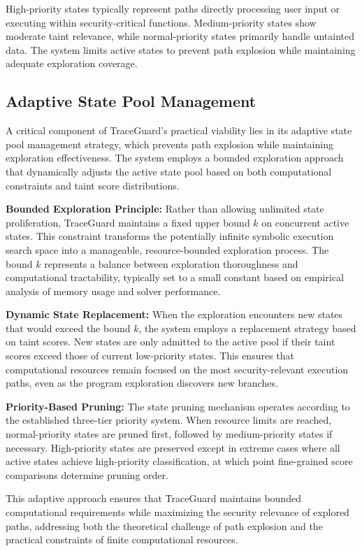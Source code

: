 High-priority states typically represent paths directly processing user input or executing within security-critical functions. Medium-priority states show moderate taint relevance, while normal-priority states primarily handle untainted data. The system limits active states to prevent path explosion while maintaining adequate exploration coverage.

\subsection{Adaptive State Pool Management}

A critical component of TraceGuard's practical viability lies in its adaptive state pool management strategy, which prevents path explosion while maintaining exploration effectiveness. The system employs a bounded exploration approach that dynamically adjusts the active state pool based on both computational constraints and taint score distributions.

\textbf{Bounded Exploration Principle:} Rather than allowing unlimited state proliferation, TraceGuard maintains a fixed upper bound $k$ on concurrent active states. This constraint transforms the potentially infinite symbolic execution search space into a manageable, resource-bounded exploration process. The bound $k$ represents a balance between exploration thoroughness and computational tractability, typically set to a small constant based on empirical analysis of memory usage and solver performance.

\textbf{Dynamic State Replacement:} When the exploration encounters new states that would exceed the bound $k$, the system employs a replacement strategy based on taint scores. New states are only admitted to the active pool if their taint scores exceed those of current low-priority states. This ensures that computational resources remain focused on the most security-relevant execution paths, even as the program exploration discovers new branches.

\textbf{Priority-Based Pruning:} The state pruning mechanism operates according to the established three-tier priority system. When resource limits are reached, normal-priority states are pruned first, followed by medium-priority states if necessary. High-priority states are preserved except in extreme cases where all active states achieve high-priority classification, at which point fine-grained score comparisons determine pruning order.

This adaptive approach ensures that TraceGuard maintains bounded computational requirements while maximizing the security relevance of explored paths, addressing both the theoretical challenge of path explosion and the practical constraints of finite computational resources.

